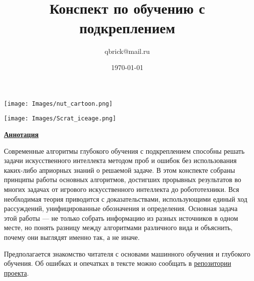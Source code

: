 \documentclass[a4paper, 10pt, oneside]{memoir}
\title{
\vspace{4cm}
\normalfont \normalsize 
\horrule{0.5pt} \\[0.4cm]
\huge Конспект по обучению с подкреплением
\horrule{2pt} \\[0.5cm]
}
\author{qbrick@mail.ru}
\date{\normalsize\today}
\begin{document}

\maketitle
\thispagestyle{empty}

\vspace{-6.3cm}
\begin{adjustwidth}{0.5cm}{}
    \texttt{[image: Images/nut\_cartoon.png]}
\end{adjustwidth}
\vspace{4cm}
\begin{center}
    \texttt{[image: Images/Scrat\_iceage.png]}
\end{center}

\vspace{2.2cm}
\begin{center}
\textcolor{ChadBlue}{\underline{\textbf{Аннотация}}}
\end{center}

\vspace{0.5cm}
Современные алгоритмы глубокого обучения с подкреплением способны решать задачи искусственного интеллекта методом проб и ошибок без использования каких-либо априорных знаний о решаемой задаче. В этом конспекте собраны принципы работы основных алгоритмов, достигших прорывных результатов во многих задачах от игрового искусственного интеллекта до робототехники. Вся необходимая теория приводится с доказательствами, использующими единый ход рассуждений, унифицированные обозначения и определения. Основная задача этой работы --- не только собрать информацию из разных источников в одном месте, но понять разницу между алгоритмами различного вида и объяснить, почему они выглядят именно так, а не иначе.

\vspace{0.3cm}
Предполагается знакомство читателя с основами машинного обучения и глубокого обучения. Об ошибках и опечатках в тексте можно сообщать в \href{https://github.com/FortsAndMills/RL-Theory-book}{репозитории проекта}.

\end{document}
